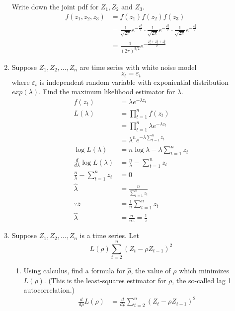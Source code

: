 \documentclass[12pt]{article}
\begin{document}
\begin{enumerate}
    Write down the joint pdf for $Z_1, Z_2 \text{ and } Z_3$.
    \begin{align*}
        f(z_1, z_2, z_3) &= f(z_1) f(z_2) f(z_3) \\
        &= \frac{1}{\sqrt{2\pi}} e^{-\frac{z_1^2}{2}} \cdot \frac{1}{\sqrt{2\pi}} e^{-\frac{z_2^2}{2}} \cdot \frac{1}{\sqrt{2\pi}} e^{-\frac{z_3^2}{2}} \\
        &= \frac{1}{(2\pi)^{3/2}} e^{-\frac{z_1^2 + z_2^2 + z_3^2}{2}}
    \end{align*}
    \item  Suppose $Z_1, Z_2, \ldots , Z_n$ are time series with white noise model
    \[ z_t = \varepsilon_t \]
    where $\varepsilon_t$ is independent random variable with exponiential distribution $exp(\lambda)$.
    Find the maximum likelihood estimator for $\lambda$.
    \begin{align*}
        f(z_t) &= \lambda e^{-\lambda z_t} \\
        L(\lambda) &= \prod_{t=1}^{n} f(z_t) \\
        &= \prod_{t=1}^{n} \lambda e^{-\lambda z_t} \\
        &= \lambda^n e^{-\lambda \sum_{t=1}^{n} z_t} \\
        \log L(\lambda) &= n \log \lambda - \lambda \sum_{t=1}^{n} z_t \\
        \frac{d}{d\lambda} \log L(\lambda) &= \frac{n}{\lambda} - \sum_{t=1}^{n} z_t \\
        \frac{n}{\lambda} - \sum_{t=1}^{n} z_t &= 0 \\
        \hat{\lambda} &= \frac{n}{\sum_{t=1}^{n} z_t} \\
        \because \bar{z} &= \frac{1}{n} \sum_{t=1}^{n} z_t \\
        \hat{\lambda} &= \frac{n}{n \bar{z}} = \frac{1}{\bar{z}}
    \end{align*}
    \item Suppose $Z_1, Z_2, \ldots, Z_n$ is a time series. Let 
    \[ L(\rho) \sum_{t = 2}^{n}(Z_t - \rho Z_{t-1})^2 \]
    \begin{enumerate}
        \item  Using calculus, find a formula for $\hat{\rho}$, the value of $\rho$ 
        which minimizes $L(\rho)$. (This is the least-squares estimator for $\rho$, 
        the so-called lag 1 autocorrelation.)
        \begin{align*}
            \frac{d}{d\rho} L(\rho) &= \frac{d}{d\rho} \sum_{t = 2}^{n}(Z_t - \rho Z_{t-1})^2 \\

\end{align*}
\end{enumerate}
\end{enumerate}
\end{document}

